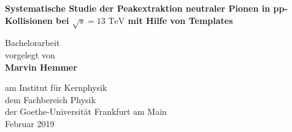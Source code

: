 \vspace*{1cm}

\huge
\textbf{Systematische Studie der Peakextraktion neutraler Pionen in pp-Kollisionen bei $\sqrt{s}=13\text{ TeV}$ mit Hilfe von Templates}

 
\vspace{3.5cm}
\LARGE
Bachelorarbeit\\
vorgelegt von\\
\textbf{Marvin Hemmer}

\vfill
 
\Large
am Institut für Kernphysik\\
dem Fachbereich Physik\\
der Goethe-Universität Frankfurt am Main\\
Februar 2019
 